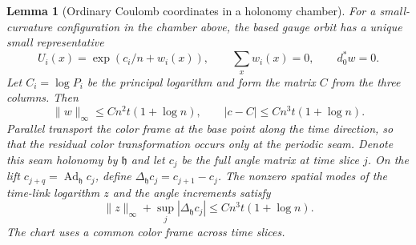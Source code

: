 \documentclass[11pt,a4paper]{article}
\newtheorem{lemma}[theorem]{Lemma}
\numberwithin{equation}{section}
\newcommand{\hper}{\mathfrak h}
\begin{document}
\begin{lemma}[Ordinary Coulomb coordinates in a holonomy chamber]\label{lem:cam-soft-chart}
For a small-curvature configuration in the chamber above, the based gauge orbit has a unique small representative
\[
  U_i(x)=\exp(c_i/n+w_i(x)),\qquad
  \sum_x w_i(x)=0,\qquad d_0^*w=0 .
\]
Let \(C_i=\log P_i\) be the principal logarithm and form the matrix \(C\) from the three columns. Then
\begin{equation}
 \|w\|_\infty\le Cn^2t(1+\log n),\qquad
 |c-C|\le Cn^3t(1+\log n).
 \label{eq:cam-soft-chart-bound}
\end{equation}
Parallel transport the color frame at the base point along the time direction, so that the residual color transformation occurs only at the periodic seam. Denote this seam holonomy by \(\hper\) and let \(c_j\) be the full angle matrix at time slice \(j\). On the lift \(c_{j+q}=\operatorname{Ad}_\hper  c_j\), define \(\Delta_\hper  c_j=c_{j+1}-c_j\). The nonzero spatial modes of the time-link logarithm \(z\) and the angle increments satisfy
\begin{equation}
 \|z\|_\infty+\sup_j |\Delta_\hper  c_j|
       \le C n^3t(1+\log n).
 \label{eq:cam-soft-time-links}
\end{equation}
The chart uses a common color frame across time slices.
\end{lemma}
\end{document}
